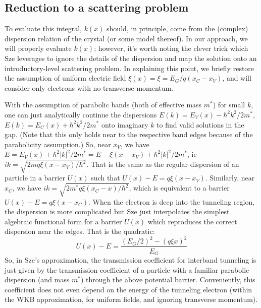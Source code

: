 \subsection{Reduction to a scattering problem}
To evaluate this integral, $k(x)$ should, in principle, come from the (complex) dispersion relation of the crystal (or some model thereof).  In our approach, we will properly evaluate $k(x)$; however, it's worth noting the clever trick which Sze leverages to ignore the details of the dispersion and map the solution onto an introductory-level scattering problem.  In explaining this point, we briefly restore the assumption of uniform electric field $\xi(x)=\xi=E_G/q(x_C-x_V)$, and will consider only electrons with no transverse momentum.

With the assumption of parabolic bands (both of effective mass $m^*$) for small $k$, one can just analytically continue the dispersions $E(k)=E_V(x)-\hbar^2k^2/2m^*$, $E(k)=E_C(x)+\hbar^2k^2/2m^*$ onto imaginary $k$ to find valid solutions in the gap.  (Note that this only holds near to the respective band edges because of the parabolicity assumption.)  So, near $x_V$, we have $E=E_V(x)+\hbar^2|k|^2/2m^*=E-\xi(x-x_V)+\hbar^2|k|^2/2m^*$, ie $ik=\sqrt{2mq\xi(x-x_V)/\hbar^2}$.  That is the same as the regular dispersion of an particle in a barrier $U(x)$ such that $U(x)-E=q\xi(x-x_V)$.  Similarly, near $x_C$, we have $ik=\sqrt{2m^*q\xi(x_C-x)/\hbar^2}$, which is equivalent to a barrier $U(x)-E=q\xi(x-x_C)$.  When the electron is deep into the tunneling region, the dispersion is more complicated but Sze just interpolates the simplest algebraic functional form for a barrier $U(x)$ which reproduces the correct dispersion near the edges.  That is the quadratic:
$$U(x)-E=\frac{(E_G/2)^2-(q\xi x)^2}{E_G}$$
So, in Sze's approximation, the transmission coefficient for interband tunneling is just given by the transmission coefficient of a particle with a familiar parabolic dispersion (and mass $m^*$) through the above potential barrier.  Conveniently, this coefficient does not even depend on the energy of the tunneling electron (within the WKB approximation, for uniform fields, and ignoring transverse momentum).